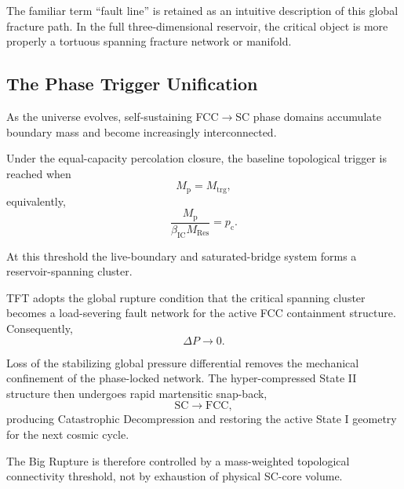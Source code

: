 The familiar term ``fault line'' is retained as an intuitive description of
this global fracture path. In the full three-dimensional reservoir, the
critical object is more properly a tortuous spanning fracture network or
manifold.


\subsection{The Phase Trigger Unification}

As the universe evolves, self-sustaining FCC$\rightarrow$SC phase domains
accumulate boundary mass and become increasingly interconnected.

Under the equal-capacity percolation closure, the baseline topological trigger
is reached when
\begin{equation}
    M_{\mathrm p}
    =
    M_{\mathrm{trg}},
\end{equation}
equivalently,
\begin{equation}
    \frac{
        M_{\mathrm p}
    }{
        \beta_{\mathrm{IC}}
        M_{\mathrm{Res}}
    }
    =
    p_{\mathrm c}.
\end{equation}

At this threshold the live-boundary and saturated-bridge system forms a
reservoir-spanning cluster.

TFT adopts the global rupture condition that the critical spanning cluster
becomes a load-severing fault network for the active FCC containment
structure. Consequently,
\begin{equation}
    \Delta P
    \rightarrow
    0.
\end{equation}

Loss of the stabilizing global pressure differential removes the mechanical
confinement of the phase-locked network. The hyper-compressed State II
structure then undergoes rapid martensitic snap-back,
\begin{equation}
    \mathrm{SC}
    \rightarrow
    \mathrm{FCC},
\end{equation}
producing Catastrophic Decompression and restoring the active State I
geometry for the next cosmic cycle.

The Big Rupture is therefore controlled by a mass-weighted topological
connectivity threshold, not by exhaustion of physical SC-core volume.


